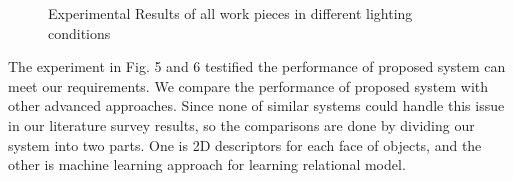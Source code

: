 \documentclass{tADR2e}
\begin{document}
\begin{figure}
\begin{center}


\caption{Experimental Results of all work pieces in different lighting conditions}
\end{center}
\end{figure}

The experiment in Fig. 5 and 6 testified the performance of proposed system can meet our requirements. We compare the performance of proposed system with other advanced approaches. Since none of similar systems could handle this issue in our literature survey results, so the comparisons are done by dividing our system into two parts. One is 2D descriptors for each face of objects, and the other is machine learning approach for learning relational model.
\end{document}

